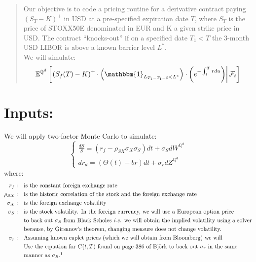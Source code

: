 \documentclass[11pt, letterpaper]{article}
\def\EE{\ensuremath{\mathbb{E}}} %
\def\QQ{\ensuremath{\mathbb{Q}}} %
\def\F{\ensuremath{\mathcal{F}}} %
\begin{document}
	\begin{abstract}
		\noindent Our objective is to code a pricing routine for a derivative contract paying $(S_T-K)^+$ in USD at a pre-specified expiration date $T$, where $S_T$ is the price of STOXX50E denominated in EUR and K a given strike price in USD. The contract ``knocks-out'' if on a specified date $T_1<T$ the 3-month USD LIBOR is above a known barrier level $L^*$. \\
		
		\noindent We will simulate: $$\EE^{\QQ^d}\left[\left.\left(S_f(T)-K\right)^+\cdot\left(\mathbbm{1}_{L_{T_1-T_1+\delta}<L^*}\right)\cdot \left(e^{-\int_t^T r du}\right)\right\vert\F_t\right]$$
	\end{abstract}
		
	\section{Inputs:}
	We will apply two-factor Monte Carlo to simulate:
	\begin{equation*}
		\begin{cases}
		    \frac{dS}{S} = (r_f-\rho_{SX}\sigma_X\sigma_S)dt+\sigma_S dW^{\QQ^d} \\
		    dr_d = (\Theta(t)-br)dt + \sigma_r dZ^{\QQ^d}
	    \end{cases}
	\end{equation*}
	where:
	\begin{align*}
		r_f: & \quad\textrm{is the constant foreign exchange rate}\\
		\rho_{SX}: &\quad\textrm{is the historic correlation of the stock and the foreign exchange rate}\\
		\sigma_X: &\quad\textrm{is the foreign exchange volatility}\\
		\sigma_S: &\quad\textrm{is the stock volatility. In the foreign currency, we will use a European option price} \\ 
		&\quad\textrm{to back out $\sigma_S$ from Black Scholes \textit{i.e.} we will obtain the implied volatility using a solver} \\
		&\quad\textrm{because, by Girsanov's theorem, changing measure does not change volatility.} \\
		\sigma_r: & \quad\textrm{Assuming known caplet prices (which we will obtain from Bloomberg) we will} \\
		&\quad\textrm{Use the equation for $C(t,T)$ found on page 386 of Bj\"{o}rk to back out $\sigma_r$ in the same} \\
		&\quad\textrm{manner as $\sigma_S$.}\footnotemark{}
	\end{align*}
\end{document}

